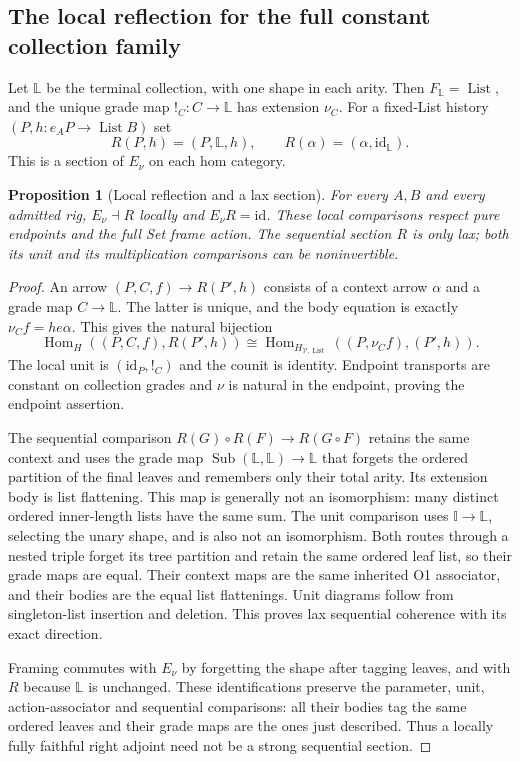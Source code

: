 \documentclass[11pt,a4paper]{article}
\newtheorem{proposition}[theorem]{Proposition}
\theoremstyle{definition}
\newcommand{\V}{\mathcal V}
\newcommand{\id}{\mathrm{id}}
\newcommand{\List}{\operatorname{List}}
\newcommand{\Sub}{\operatorname{Sub}}
\newcommand{\Hom}{\operatorname{Hom}}
\begin{document}
\subsection{The local reflection for the full constant collection family}
Let $\mathbb L$ be the terminal collection, with one shape in each arity.
Then $F_{\mathbb L}=\List$, and the unique grade map
$!_C:C\to\mathbb L$ has extension $\nu_C$.
For a fixed-List history $(P,h:e_AP\to\List B)$ set
\[
 R(P,h)=(P,\mathbb L,h),\qquad R(\alpha)=(\alpha,\id_{\mathbb L}).
\]
This is a section of $E_\nu$ on each hom category.

\begin{proposition}[Local reflection and a lax section]\label{prop:arity-reflection}
For every $A,B$ and every admitted rig, $E_\nu\dashv R$ locally and
$E_\nu R=\id$. These local comparisons respect pure endpoints and the full
Set frame action. The sequential section $R$ is only lax; both its unit
and its multiplication comparisons can be noninvertible.
\end{proposition}
\begin{proof}
An arrow $(P,C,f)\to R(P',h)$ consists of a context arrow $\alpha$ and a
grade map $C\to\mathbb L$. The latter is unique, and the body equation is
exactly $\nu_Cf=h e\alpha$. This gives the natural bijection
\[
 \Hom_H((P,C,f),R(P',h))
 \cong\Hom_{H_{\V,\List}}((P,\nu_Cf),(P',h)).
\]
The local unit is $(\id_P,!_C)$ and the counit is identity.
Endpoint transports are constant on collection grades and $\nu$ is natural
in the endpoint, proving the endpoint assertion.

The sequential comparison $R(G)\circ R(F)\to R(G\circ F)$ retains the
same context and uses the grade map
$\Sub(\mathbb L,\mathbb L)\to\mathbb L$ that forgets the ordered
partition of the final leaves and remembers only their total arity.
Its extension body is list flattening. This map is generally not an
isomorphism: many distinct ordered inner-length lists have the same sum.
The unit comparison uses $\mathbb I\to\mathbb L$, selecting the unary
shape, and is also not an isomorphism. Both routes through a nested triple
forget its tree partition and retain the same ordered leaf list, so their
grade maps are equal. Their context maps are the same inherited O1
associator, and their bodies are the equal list flattenings. Unit diagrams
follow from singleton-list insertion and deletion. This proves lax
sequential coherence with its exact direction.

Framing commutes with $E_\nu$ by forgetting the shape after tagging leaves,
and with $R$ because $\mathbb L$ is unchanged. These identifications
preserve the parameter, unit, action-associator and sequential comparisons:
all their bodies tag the same ordered leaves and their grade maps are the
ones just described. Thus a locally fully faithful right adjoint need not
be a strong sequential section.
\end{proof}
\end{document}
